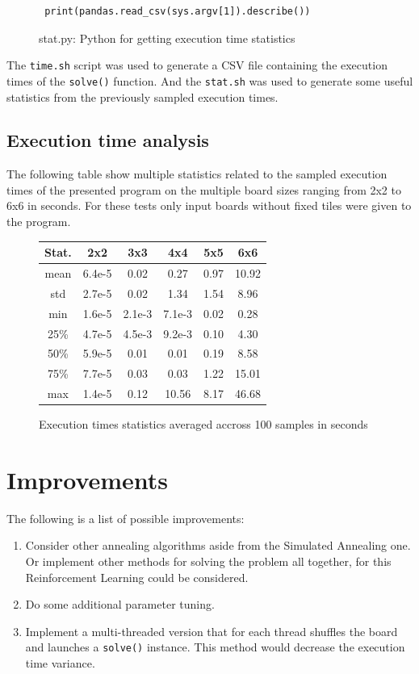 \documentclass[11pt]{article}
\begin{document}
\begin{multicols*}{2}
\begin{figure}[H]
\begin{minipage}{0.5\textwidth}
\begin{verbatim}
 print(pandas.read_csv(sys.argv[1]).describe())
    \end{verbatim}
  \end{minipage}
  \caption{stat.py: Python for getting execution time statistics}
  \label{fig:stat}
\end{figure}
\noindent The \texttt{time.sh} script was used to generate a CSV file containing the
execution times of the \texttt{solve()} function. And the \texttt{stat.sh} was
used to generate some useful statistics from the previously sampled execution
times.
\subsection{Execution time analysis}
The following table show multiple statistics related to the sampled execution
times of the presented program on the multiple board sizes ranging from 2x2 to
6x6 in seconds. For these tests only input boards without fixed tiles were given
to the program.
\begin{figure}[H]
  \centering
  \begin{tabular}{|| c c c c c c ||}
    \hline
    Stat. & 2x2 & 3x3 & 4x4 & 5x5 & 6x6\\ [0.5ex]
    \hline\hline
    mean & 6.4e-5 & 0.02 & 0.27 & 0.97 & 10.92\\
    std  & 2.7e-5 & 0.02 & 1.34 & 1.54 & 8.96\\
    min  & 1.6e-5 & 2.1e-3 & 7.1e-3 & 0.02 & 0.28\\
    25\% & 4.7e-5 & 4.5e-3 & 9.2e-3 & 0.10 & 4.30\\
    50\% & 5.9e-5 & 0.01 & 0.01 & 0.19 & 8.58\\
    75\% & 7.7e-5 & 0.03 & 0.03 & 1.22 & 15.01\\
    max  & 1.4e-5 & 0.12 & 10.56 & 8.17 & 46.68\\
    \hline
  \end{tabular}
  \caption{Execution times statistics averaged accross 100 samples in seconds}
  \label{fig:exec-stat}
\end{figure}
\section{Improvements}
The following is a list of possible improvements:
\begin{enumerate}
\item Consider other annealing algorithms aside from the Simulated Annealing
  one. Or implement other methods for solving the problem all together, for this
  Reinforcement Learning could be considered.
\item Do some additional parameter tuning.
\item Implement a multi-threaded version that for each thread shuffles the board
  and launches a \texttt{solve()} instance. This method would decrease the
  execution time variance.
\end{enumerate}

\end{multicols*}
\end{document}
